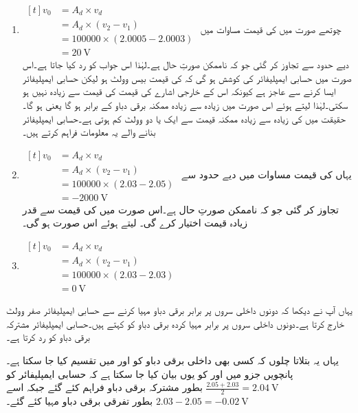 \begin{enumerate}
\item $\begin{aligned}[t]
v_0 &=A_d \times v_d \\
&=A_d \times \left (v_2 - v_1 \right )\\
&=100000 \times \left(2.0005-2.0003 \right )\\
&=\SI{20}{\volt}
\end{aligned}$
چوتھے صورت میں  کی قیمت مساوات  میں دیے حدود سے تجاوز کر گئی جو کہ ناممکن صورتِ حال ہے۔لہٰذا اس جواب کو رد کیا جاتا ہے۔اس صورت میں حسابی ایمپلیفائر کی کوشش ہو گی کہ  کی قیمت بیس وولٹ ہو لیکن حسابی ایمپلیفائر ایسا کرنے سے عاجز ہے  کیونکہ اس کے خارجی اشارے  کی قیمت  کی قیمت سے زیادہ نہیں ہو سکتی۔لہٰذا   لیتے ہوئے اس صورت میں  زیادہ سے زیادہ ممکنہ برقی دباو کے برابر ہو گا یعنی ہو گا۔حقیقت میں  کی زیادہ سے زیادہ ممکنہ قیمت  سے ایک یا دو وولٹ کم ہوتی ہے۔حسابی ایمپلیفائر بنانے والے یہ معلومات فراہم کرتے ہیں۔
\item $\begin{aligned}[t]
v_0 &=A_d \times v_d \\
&=A_d \times \left (v_2 - v_1 \right )\\
&=100000 \times \left(2.03-2.05 \right )\\
&=\SI{-2000}{\volt}
\end{aligned}$
یہاں  کی قیمت مساوات   میں دیے حدود سے تجاوز کر گئی جو کہ ناممکن صورتِ حال ہے۔اس صورت میں  کی قیمت   سے قدر زیادہ قیمت اختیار کرے گی۔ لیتے ہوئے اس صورت ہو گی۔
\item $\begin{aligned}[t]
v_0 &=A_d \times v_d \\
&=A_d \times \left (v_2 - v_1 \right )\\
&=100000 \times \left(2.03-2.03 \right )\\
&=\SI{0}{\volt}
\end{aligned}$
\end{enumerate}
یہاں آپ نے دیکھا کہ دونوں داخلی سروں پر برابر برقی دباو مہیا کرنے سے حسابی ایمپلیفائر صفر وولٹ خارج کرتا ہے۔دونوں داخلی سروں پر برابر مہیا کردہ برقی دباو کو   کہتے ہیں۔حسابی ایمپلیفائر مشترکہ برقی دباو کو رد کرتا ہے۔


یہاں یہ بتلاتا چلوں کہ کسی بھی داخلی برقی دباو کو   اور   میں تقسیم کیا جا سکتا ہے۔پانچویں جزو میں  اور  کو یوں بیان کیا جا سکتا ہے کہ حسابی ایمپلیفائر کو 
\( \tfrac{2.05+2.03}{2}=\SI{2.04}{\volt} \)
بطور مشترکہ برقی دباو فراہم کئے گئے جبکہ اسے
\( 2.03-2.05=\SI{-0.02}{\volt}\)
بطور تفرقی برقی دباو مہیا کئے گئے۔

